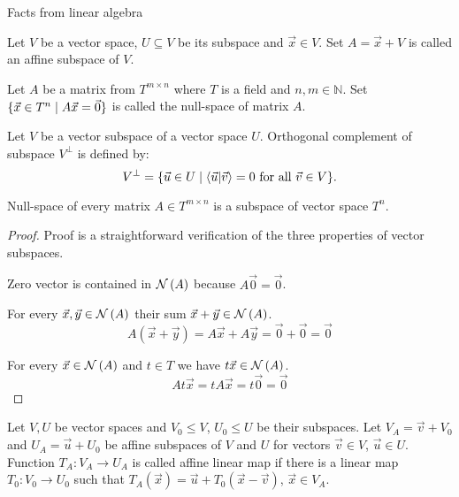 \begin{chapter}{Facts from linear algebra}
\label{appendix-linear-algebra}
\begin{definition}
Let $V$ be a vector space, $U \subseteq V$ be its subspace and $\vec{x} \in V$. Set $A = \vec{x} + V$ is called an affine subspace of $V$.
\end{definition}

\begin{definition}
Let $A$ be a matrix from $T ^ {m \times n}$ where $T$ is a field and $n, m \in \mathbb{N}$. Set $\{ \vec{x} \in T^{n} \mid A\vec{x} = \vec{0} \}$ is called the null-space of matrix $A$.
\end{definition}

\begin{definition}
Let $V$ be a vector subspace of a vector space $U$. Orthogonal complement of subspace $V ^ {\bot}$ is defined by:
\[
	V ^ {\bot} = \{ \vec{u} \in U \mid \langle \vec{u} | \vec{v} \rangle = 0 \text{ for all } \vec{v} \in V \} \text{.}
\]
\end{definition}

\begin{remark}
Null-space of every matrix $A \in T ^ {m \times n}$ is a subspace of vector space $T^{n}$.
\end{remark}
\begin{proof}
Proof is a straightforward verification of the three properties of vector subspaces.

Zero vector is contained in $\mathcal{N}\left({A}\right)$ because $A\vec{0} = \vec{0}$.

For every $\vec{x}, \vec{y} \in \mathcal{N}\left({A}\right)$ their sum $\vec{x} + \vec{y} \in \mathcal{N}\left({A}\right)$.
\[
	A(\vec{x} + \vec{y}) = A\vec{x} + A\vec{y} = \vec{0} + \vec{0} = \vec{0}
\]

For every $\vec{x} \in \mathcal{N}\left({A}\right)$ and $t \in T$ we have $t \vec{x} \in \mathcal{N}\left({A}\right)$.
\[
	At\vec{x} = tA\vec{x} = t\vec{0} = \vec{0}
\]
\end{proof}

\begin{definition}
Let $V, U$ be vector spaces and $V_0 \leq V$, $U_0 \leq U$ be their subspaces. Let $V_A = \vec{v} + V_0$ and $U_A = \vec{u} + U_0$ be affine subspaces of $V$ and $U$ for vectors $\vec{v} \in V$, $\vec{u} \in U$. Function $T_A: V_A \rightarrow U_A$ is called affine linear map if there is a linear map $T_0: V_0 \rightarrow U_0$ such that $T_A(\vec{x}) = \vec{u} + T_0(\vec{x} - \vec{v})$, $\vec{x} \in V_A$.
\end{definition}


\end{chapter}
